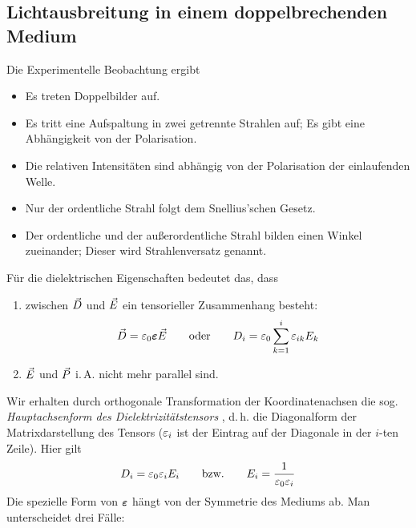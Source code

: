 \subsection{Lichtausbreitung in einem doppelbrechenden Medium}
Die Experimentelle Beobachtung ergibt
\begin{itemize}
\item Es treten Doppelbilder auf.
\item Es tritt eine Aufspaltung in zwei getrennte Strahlen auf; Es
  gibt eine Abhängigkeit von der Polarisation.
\item Die relativen Intensitäten sind abhängig von der Polarisation
  der einlaufenden Welle.
\item Nur der ordentliche Strahl folgt dem Snellius'schen Gesetz.
\item Der ordentliche und der außerordentliche Strahl bilden einen
  Winkel zueinander; Dieser wird
  Strahlenversatz genannt.
\end{itemize}
Für die dielektrischen Eigenschaften bedeutet das, dass
\begin{enumerate}
\item zwischen $\vec{D}$ und $\vec{E}$ ein tensorieller Zusammenhang
  besteht:
  \begin{gather*}
    \vec{D}=\varepsilon_0\boldsymbol{\varepsilon}\vec{E}
    \qquad\text{oder}\qquad
    D_i = \varepsilon_0\sum_{k=1}^i \varepsilon_{ik}E_k
  \end{gather*}%
\item $\vec{E}$ und $\vec{P}$ i.\,A. nicht mehr parallel sind.
\end{enumerate}
Wir erhalten durch orthogonale Transformation der Koordinatenachsen die
sog. \emph{Hauptachsenform des Dielektrizitätstensors}%
,
d.\,h. die Diagonalform der Matrixdarstellung des Tensors 
($\varepsilon_i$%
ist der Eintrag auf der Diagonale in der $i$-ten Zeile). Hier gilt
\begin{gather*}
  D_i = \varepsilon_0\varepsilon_iE_i
  \qquad\text{bzw.}\qquad
  E_i = \frac{1}{\varepsilon_0\varepsilon_i}
\end{gather*}%
Die spezielle Form von $\boldsymbol{\varepsilon}$ hängt von der Symmetrie des Mediums ab.
Man unterscheidet drei Fälle:
